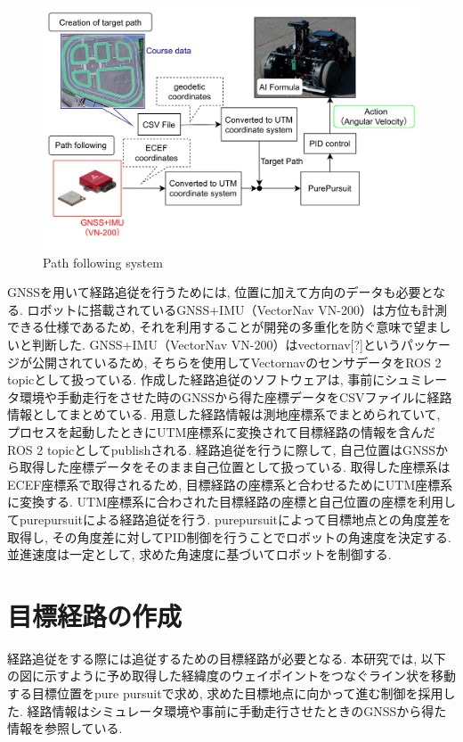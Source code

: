 \begin{figure}[H]
  \centering
 \includegraphics[keepaspectratio, scale=0.2]
      {images/system.png}
 \caption{Path following system}
 \label{fig:system}
\end{figure}

GNSSを用いて経路追従を行うためには, 位置に加えて方向のデータも必要となる.
ロボットに搭載されているGNSS+IMU（VectorNav VN-200）は方位も計測できる仕様であるため, それを利用することが開発の多重化を防ぐ意味で望ましいと判断した.
GNSS+IMU（VectorNav VN-200）はvectornav[?]というパッケージが公開されているため, そちらを使用してVectornavのセンサデータをROS 2 topicとして扱っている.
作成した経路追従のソフトウェアは, 事前にシュミレータ環境や手動走行をさせた時のGNSSから得た座標データをCSVファイルに経路情報としてまとめている.
用意した経路情報は測地座標系でまとめられていて, プロセスを起動したときにUTM座標系に変換されて目標経路の情報を含んだROS 2 topicとしてpublishされる.
経路追従を行うに際して, 自己位置はGNSSから取得した座標データをそのまま自己位置として扱っている.
取得した座標系はECEF座標系で取得されるため, 目標経路の座標系と合わせるためにUTM座標系に変換する.
UTM座標系に合わされた目標経路の座標と自己位置の座標を利用してpurepursuitによる経路追従を行う.
purepursuitによって目標地点との角度差を取得し, その角度差に対してPID制御を行うことでロボットの角速度を決定する.
並進速度は一定として, 求めた角速度に基づいてロボットを制御する.

\section{目標経路の作成}
経路追従をする際には追従するための目標経路が必要となる.
本研究では, 以下の図に示すように予め取得した経緯度のウェイポイントをつなぐライン状を移動する目標位置をpure pursuitで求め, 求めた目標地点に向かって進む制御を採用した.
経路情報はシミュレータ環境や事前に手動走行させたときのGNSSから得た情報を参照している.

